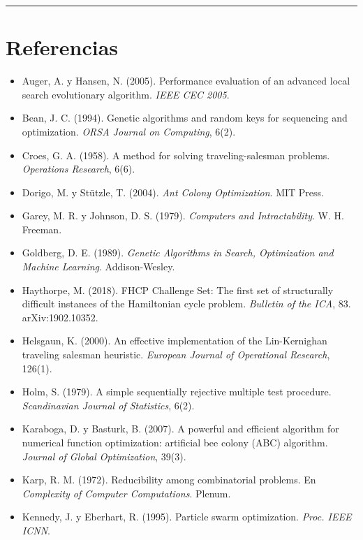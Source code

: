 \documentclass[
  spanish,
  11pt,
]{article}
\providecommand{\tightlist}{%
  \setlength{\itemsep}{0pt}\setlength{\parskip}{0pt}}
\begin{document}
\begin{center}\rule{0.5\linewidth}{0.5pt}\end{center}

\section{Referencias}\label{referencias}

\begin{itemize}
\tightlist
\item
  Auger, A. y Hansen, N. (2005). Performance evaluation of an advanced
  local search evolutionary algorithm. \emph{IEEE CEC 2005}.
\item
  Bean, J. C. (1994). Genetic algorithms and random keys for sequencing
  and optimization. \emph{ORSA Journal on Computing}, 6(2).
\item
  Croes, G. A. (1958). A method for solving traveling-salesman problems.
  \emph{Operations Research}, 6(6).
\item
  Dorigo, M. y Stützle, T. (2004). \emph{Ant Colony Optimization}. MIT
  Press.
\item
  Garey, M. R. y Johnson, D. S. (1979). \emph{Computers and
  Intractability}. W. H. Freeman.
\item
  Goldberg, D. E. (1989). \emph{Genetic Algorithms in Search,
  Optimization and Machine Learning}. Addison-Wesley.
\item
  Haythorpe, M. (2018). FHCP Challenge Set: The first set of
  structurally difficult instances of the Hamiltonian cycle problem.
  \emph{Bulletin of the ICA}, 83. arXiv:1902.10352.
\item
  Helsgaun, K. (2000). An effective implementation of the Lin-Kernighan
  traveling salesman heuristic. \emph{European Journal of Operational
  Research}, 126(1).
\item
  Holm, S. (1979). A simple sequentially rejective multiple test
  procedure. \emph{Scandinavian Journal of Statistics}, 6(2).
\item
  Karaboga, D. y Basturk, B. (2007). A powerful and efficient algorithm
  for numerical function optimization: artificial bee colony (ABC)
  algorithm. \emph{Journal of Global Optimization}, 39(3).
\item
  Karp, R. M. (1972). Reducibility among combinatorial problems. En
  \emph{Complexity of Computer Computations}. Plenum.
\item
  Kennedy, J. y Eberhart, R. (1995). Particle swarm optimization.
  \emph{Proc. IEEE ICNN}.

\end{itemize}
\end{document}
